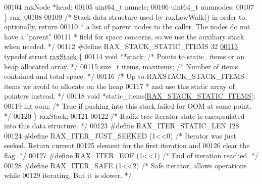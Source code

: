 \begin{DoxyCode}
00104     raxNode *head;
00105     uint64\_t numele;
00106     uint64\_t numnodes;
00107 \} rax;
00108 
00109 \textcolor{comment}{/* Stack data structure used by raxLowWalk() in order to, optionally, return}
00110 \textcolor{comment}{ * a list of parent nodes to the caller. The nodes do not have a "parent"}
00111 \textcolor{comment}{ * field for space concerns, so we use the auxiliary stack when needed. */}
00112 \textcolor{preprocessor}{#}\textcolor{preprocessor}{define} \textcolor{preprocessor}{RAX\_STACK\_STATIC\_ITEMS} 32
\hyperlink{structraxStack}{00113} \textcolor{keyword}{typedef} \textcolor{keyword}{struct} \hyperlink{structraxStack}{raxStack} \{
00114     \textcolor{keywordtype}{void} **stack; \textcolor{comment}{/* Points to static\_items or an heap allocated array. */}
00115     size\_t items, maxitems; \textcolor{comment}{/* Number of items contained and total space. */}
00116     \textcolor{comment}{/* Up to RAXSTACK\_STACK\_ITEMS items we avoid to allocate on the heap}
00117 \textcolor{comment}{     * and use this static array of pointers instead. */}
00118     \textcolor{keywordtype}{void} *static\_items[\hyperlink{rax_8h_aff05c7893713f82d106c046f55ac1bf5}{RAX\_STACK\_STATIC\_ITEMS}];
00119     \textcolor{keywordtype}{int} oom; \textcolor{comment}{/* True if pushing into this stack failed for OOM at some point. */}
00120 \} raxStack;
00121 
00122 \textcolor{comment}{/* Radix tree iterator state is encapsulated into this data structure. */}
00123 \textcolor{preprocessor}{#}\textcolor{preprocessor}{define} \textcolor{preprocessor}{RAX\_ITER\_STATIC\_LEN} 128
00124 \textcolor{preprocessor}{#}\textcolor{preprocessor}{define} \textcolor{preprocessor}{RAX\_ITER\_JUST\_SEEKED} \textcolor{preprocessor}{(}1\textcolor{preprocessor}{<<}0\textcolor{preprocessor}{)} \textcolor{comment}{/* Iterator was just seeked. Return current}
00125 \textcolor{comment}{                                       element for the first iteration and}
00126 \textcolor{comment}{                                       clear the flag. */}
00127 \textcolor{preprocessor}{#}\textcolor{preprocessor}{define} \textcolor{preprocessor}{RAX\_ITER\_EOF} \textcolor{preprocessor}{(}1\textcolor{preprocessor}{<<}1\textcolor{preprocessor}{)}    \textcolor{comment}{/* End of iteration reached. */}
00128 \textcolor{preprocessor}{#}\textcolor{preprocessor}{define} \textcolor{preprocessor}{RAX\_ITER\_SAFE} \textcolor{preprocessor}{(}1\textcolor{preprocessor}{<<}2\textcolor{preprocessor}{)}   \textcolor{comment}{/* Safe iterator, allows operations while}
00129 \textcolor{comment}{                                  iterating. But it is slower. */}

\end{DoxyCode}
